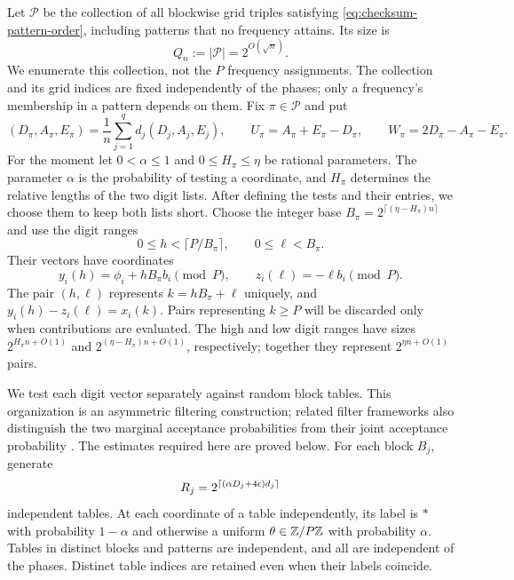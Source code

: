 Let $\mathcal P$ be the collection of all blockwise grid triples
satisfying \eqref{eq:checksum-pattern-order}, including patterns that
no frequency attains.  Its size is
\begin{equation}
 Q_n:=|\mathcal P|=2^{O(\sqrt n)}.
 \label{eq:checksum-pattern-count}
\end{equation}
We enumerate this collection, not the $P$ frequency assignments.
The collection and its grid indices are fixed independently of the
phases; only a frequency's membership in a pattern depends on them.
Fix $\pi\in\mathcal P$ and put
\[
 (D_\pi,A_\pi,E_\pi)
   =\frac1n\sum_{j=1}^q d_j(D_j,A_j,E_j),\qquad
 U_\pi=A_\pi+E_\pi-D_\pi,\qquad
 W_\pi=2D_\pi-A_\pi-E_\pi.
\]
For the moment let $0<\alpha\le1$ and $0\le H_\pi\le\eta$
be rational parameters.  The parameter $\alpha$ is the probability of
testing a coordinate, and $H_\pi$ determines the relative lengths of
the two digit lists.  After defining
the tests and their entries, we choose them to keep both lists short.
Choose the integer base
$B_\pi=2^{\lceil(\eta-H_\pi)n\rceil}$ and use the digit ranges
\[
 0\le h<\lceil P/B_\pi\rceil,
 \qquad 0\le\ell<B_\pi.
\]
Their vectors have coordinates
\[
 y_i(h)=\phi_i+hB_\pi b_i\pmod P,
 \qquad z_i(\ell)=-\ell b_i\pmod P.
\]
The pair $(h,\ell)$ represents $k=hB_\pi+\ell$ uniquely, and
$y_i(h)-z_i(\ell)=x_i(k)$.  Pairs representing $k\ge P$ will be
discarded only when contributions are evaluated.  The high and low
digit ranges have sizes $2^{H_\pi n+O(1)}$ and
$2^{(\eta-H_\pi)n+O(1)}$, respectively; together they represent
$2^{\eta n+O(1)}$ pairs.

We test each digit vector separately against random block tables.
This organization is an asymmetric filtering construction; related
filter frameworks also distinguish the two marginal acceptance
probabilities from their joint acceptance probability
\cite{Christiani2017}.  The estimates required here are proved below.
For each block $B_j$, generate
\begin{equation}
 R_j=2^{\lceil(\alpha D_j+4\epsilon)d_j\rceil}
 \label{eq:checksum-table-count}
\end{equation}
independent tables.  At each coordinate of a table independently, its
label is $*$ with probability $1-\alpha$ and otherwise a uniform
$\theta\in\mathbb Z/P\mathbb Z$ with probability $\alpha$.  Tables in distinct
blocks and patterns are independent, and all are independent of the
phases.  Distinct table indices are retained even when their labels
coincide.

